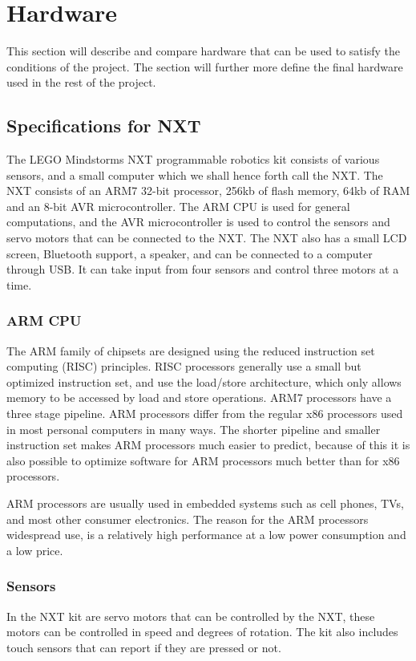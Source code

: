\section{Hardware}
This section will describe and compare hardware that can be used to satisfy the conditions of the project. The section will further more define the final hardware used in the rest of the project.

\subsection{Specifications for NXT}
The LEGO Mindstorms NXT programmable robotics kit consists of various sensors, and a small computer which we shall hence forth call the NXT. The NXT consists of an ARM7 32-bit processor, 256kb of flash memory, 64kb of RAM and an 8-bit AVR microcontroller. The ARM CPU is used for general computations, and the AVR microcontroller is used to control the sensors and servo motors that can be connected to the NXT. The NXT also has a small LCD screen, Bluetooth support, a speaker, and can be connected to a computer through USB. It can take input from four sensors and control three motors at a time.

\subsubsection{ARM CPU}
The ARM family of chipsets are designed using the reduced instruction set computing (RISC) principles. RISC processors generally use a small but optimized instruction set, and use the load/store architecture, which only allows memory to be accessed by load and store operations. ARM7 processors have a three stage pipeline. ARM processors differ from the regular x86 processors used in most personal computers in many ways. The shorter pipeline and smaller instruction set makes ARM processors much easier to predict, because of this it is also possible to optimize software for ARM processors much better than for x86 processors.

ARM processors are usually used in embedded systems such as cell phones, TVs, and most other consumer electronics. The reason for the ARM processors widespread use, is a relatively high performance at a low power consumption and a low price.

\subsubsection{Sensors}
In the NXT kit are servo motors that can be controlled by the NXT, these motors can be controlled in speed and degrees of rotation. The kit also includes touch sensors that can report if they are pressed or not.

